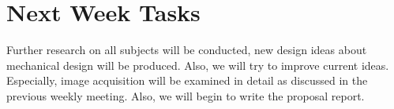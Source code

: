 \section{Next Week Tasks}
\label{sec:tasks}

Further research on all subjects will be conducted, new design ideas about mechanical design will be produced. Also, we will try to improve current ideas. Especially, image acquisition will be examined in detail as discussed in the previous weekly meeting. Also, we will begin to write the proposal report.
